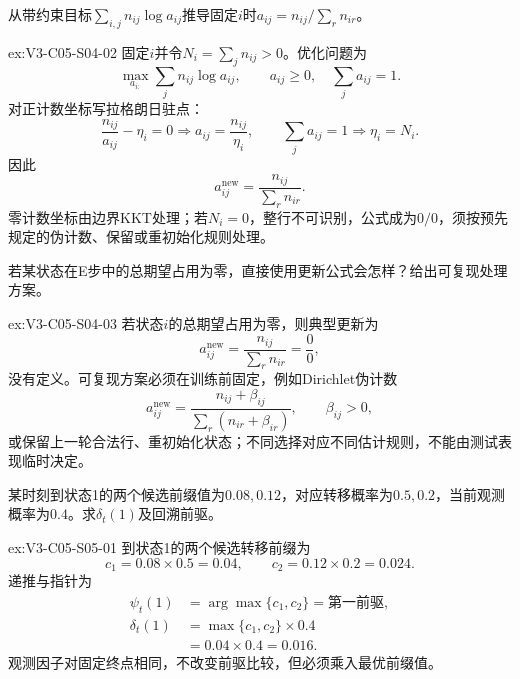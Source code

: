 \begin{SLChapterExercisePairSection}
\begin{exercise}\label{ex:V3-C05-S04-02}
从带约束目标$\sum_{i,j} n_{ij}\log a_{ij}$推导固定$i$时$a_{ij}=n_{ij}/\sum_r n_{ir}$。
\end{exercise}
\ifSLFullEdition
{}\label{sol:V3-C05-S04-02}
\begin{chapterexercisesolution}{ex:V3-C05-S04-02}
固定$i$并令$N_i=\sum_jn_{ij}>0$。优化问题为
\[
\max_{a_{i:}}\sum_jn_{ij}\log a_{ij},
\qquad
a_{ij}\geq0,\quad\sum_ja_{ij}=1.
\]
对正计数坐标写拉格朗日驻点：
\[
\frac{n_{ij}}{a_{ij}}-\eta_i=0
\Longrightarrow a_{ij}=\frac{n_{ij}}{\eta_i},
\qquad
\sum_ja_{ij}=1
\Longrightarrow \eta_i=N_i.
\]
因此
\[
a_{ij}^{\mathrm{new}}=\frac{n_{ij}}{\sum_rn_{ir}}.
\]
零计数坐标由边界KKT处理；若$N_i=0$，整行不可识别，公式成为$0/0$，须按预先规定的伪计数、保留或重初始化规则处理。
\end{chapterexercisesolution}
\fi

\begin{exercise}\label{ex:V3-C05-S04-03}
若某状态在E步中的总期望占用为零，直接使用更新公式会怎样？给出可复现处理方案。
\end{exercise}
\ifSLFullEdition
{}\label{sol:V3-C05-S04-03}
\begin{chapterexercisesolution}{ex:V3-C05-S04-03}
若状态$i$的总期望占用为零，则典型更新为
\[
a_{ij}^{\mathrm{new}}=\frac{n_{ij}}{\sum_rn_{ir}}
=\frac0{0},
\]
没有定义。可复现方案必须在训练前固定，例如Dirichlet伪计数
\[
a_{ij}^{\mathrm{new}}
=\frac{n_{ij}+\beta_{ij}}{\sum_r(n_{ir}+\beta_{ir})},
\qquad \beta_{ij}>0,
\]
或保留上一轮合法行、重初始化状态；不同选择对应不同估计规则，不能由测试表现临时决定。
\end{chapterexercisesolution}
\fi

\begin{exercise}\label{ex:V3-C05-S05-01}
某时刻到状态1的两个候选前缀值为$0.08,0.12$，对应转移概率为$0.5,0.2$，当前观测概率为$0.4$。求$\delta_t(1)$及回溯前驱。
\end{exercise}
\ifSLFullEdition
{}\label{sol:V3-C05-S05-01}
\begin{chapterexercisesolution}{ex:V3-C05-S05-01}
到状态1的两个候选转移前缀为
\[
c_1=0.08\times0.5=0.04,
\qquad
c_2=0.12\times0.2=0.024.
\]
递推与指针为
\[
\begin{aligned}
\psi_t(1)&=\arg\max\{c_1,c_2\}=\text{第一前驱},\\
\delta_t(1)&=\max\{c_1,c_2\}\times0.4\\
&=0.04\times0.4=0.016.
\end{aligned}
\]
观测因子对固定终点相同，不改变前驱比较，但必须乘入最优前缀值。
\end{chapterexercisesolution}
\fi


\end{SLChapterExercisePairSection}
